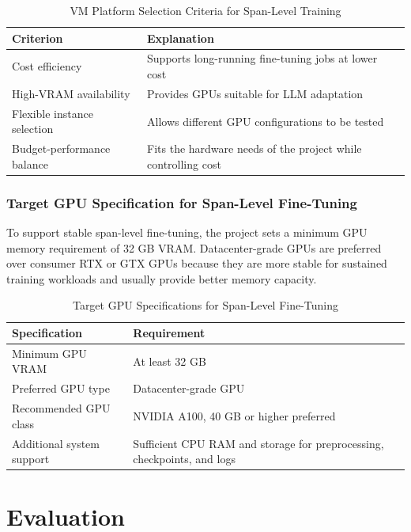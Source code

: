 \documentclass[12pt,oneside,openright,a4paper]{cpe-english-project}
\begin{document}
\begin{table}[H]
\centering
\small
\caption{VM Platform Selection Criteria for Span-Level Training}
\begin{tabularx}{\textwidth}{@{}>{\raggedright\arraybackslash}p{}>{\raggedright\arraybackslash}X@{}}
\toprule
\textbf{Criterion} & \textbf{Explanation} \\
\midrule
Cost efficiency & Supports long-running fine-tuning jobs at lower cost \\
High-VRAM availability & Provides GPUs suitable for LLM adaptation \\
Flexible instance selection & Allows different GPU configurations to be tested \\
Budget-performance balance & Fits the hardware needs of the project while controlling cost \\
\bottomrule
\end{tabularx}
\end{table}

\subsubsection{Target GPU Specification for Span-Level Fine-Tuning}

To support stable span-level fine-tuning, the project sets a minimum GPU memory requirement of 32 GB VRAM. Datacenter-grade GPUs are preferred over consumer RTX or GTX GPUs because they are more stable for sustained training workloads and usually provide better memory capacity.


\begin{table}[H]
\centering
\small
\caption{Target GPU Specifications for Span-Level Fine-Tuning}
\begin{tabularx}{\textwidth}{@{}>{\raggedright\arraybackslash}p{}>{\raggedright\arraybackslash}X@{}}
\toprule
\textbf{Specification} & \textbf{Requirement} \\
\midrule
Minimum GPU VRAM & At least 32 GB \\
Preferred GPU type & Datacenter-grade GPU \\
Recommended GPU class & NVIDIA A100, 40 GB or higher preferred \\
Additional system support & Sufficient CPU RAM and storage for preprocessing, checkpoints, and logs \\
\bottomrule
\end{tabularx}
\end{table}

\section{Evaluation}
\end{document}
